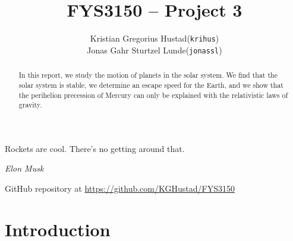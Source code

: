 \documentclass[a4paper]{article}
\begin{document}
\title{FYS3150 -- Project 3}
\author{
    \begin{tabular}{r l}
        Kristian Gregorius Hustad & (\texttt{krihus})\\
        Jonas Gahr Sturtzel Lunde & (\texttt{jonassl})
    \end{tabular}}

\maketitle




\setlength{\epigraphwidth}{0.75\textwidth}
\renewcommand{\epigraphflush}{center}
\renewcommand{\beforeepigraphskip}{50pt}
\renewcommand{\afterepigraphskip}{100pt}
\renewcommand{\epigraphsize}{\normalsize}

\epigraph{Rockets are cool. There's no getting around that.}
{\textit{Elon Musk}}


\begin{abstract}
\noindent
In this report, we study the motion of planets in the solar system. We find that the solar system is stable, we determine an escape speed for the Earth, and we show that the perihelion precession of Mercury can only be explained with the relativistic laws of gravity.
\end{abstract}

\vfill


\begin{center}
    GitHub repository at \url{https://github.com/KGHustad/FYS3150}
\end{center}

\newpage

\newcommand{\half}{\frac{1}{2}}
\newcommand{\dt}{{\Delta t}}
\newcommand{\dx}{{\Delta x}}
\newcommand{\bigO}{{\mathcal{O}}}

\newcommand{\supnew}{^{\mathrm{new}}}



\section{Introduction}\label{sec:intro}
\cite{mhj_lecture_notes} %
\end{document}
